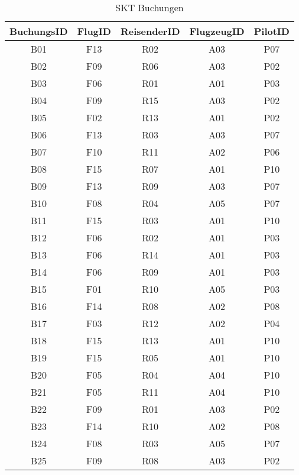 \begin{table}[htbp]
\centering
\begin{tabular}{|c|c|c|c|c|}
\hline
\bfseries BuchungsID&\bfseries FlugID&\bfseries ReisenderID&\bfseries FlugzeugID&\bfseries PilotID\\
\hline
B01&F13&R02&A03&P07\\
\hline
B02&F09&R06&A03&P02\\
\hline
B03&F06&R01&A01&P03\\
\hline
B04&F09&R15&A03&P02\\
\hline
B05&F02&R13&A01&P02\\
\hline
B06&F13&R03&A03&P07\\
\hline
B07&F10&R11&A02&P06\\
\hline
B08&F15&R07&A01&P10\\
\hline
B09&F13&R09&A03&P07\\
\hline
B10&F08&R04&A05&P07\\
\hline
B11&F15&R03&A01&P10\\
\hline
B12&F06&R02&A01&P03\\
\hline
B13&F06&R14&A01&P03\\
\hline
B14&F06&R09&A01&P03\\
\hline
B15&F01&R10&A05&P03\\
\hline
B16&F14&R08&A02&P08\\
\hline
B17&F03&R12&A02&P04\\
\hline
B18&F15&R13&A01&P10\\
\hline
B19&F15&R05&A01&P10\\
\hline
B20&F05&R04&A04&P10\\
\hline
B21&F05&R11&A04&P10\\
\hline
B22&F09&R01&A03&P02\\
\hline
B23&F14&R10&A02&P08\\
\hline
B24&F08&R03&A05&P07\\
\hline
B25&F09&R08&A03&P02\\
\hline
\end{tabular}
\caption{SKT Buchungen}
\label{tab:SKTBuchungen}
\end{table}
%
